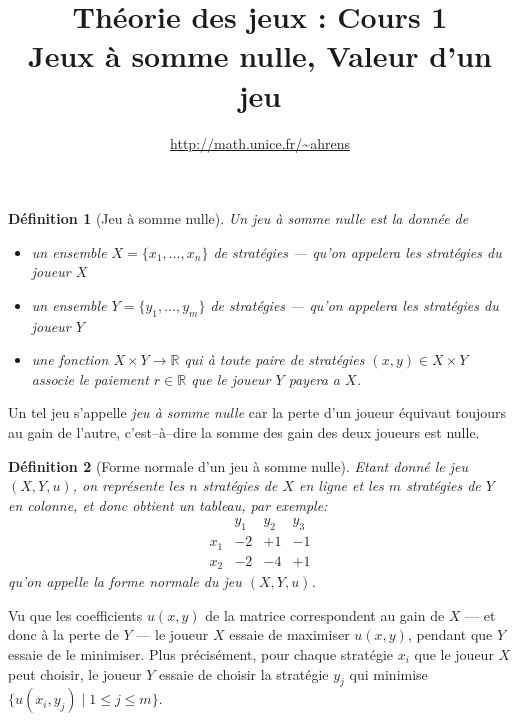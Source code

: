 \documentclass[11pt]{scrartcl}
\title{Th\'eorie des jeux : Cours 1 \\ {\large Jeux \`a somme nulle, Valeur d'un jeu}}
\author{\url{http://math.unice.fr/~ahrens}}
\date{}
\theoremstyle{mydefinition}
\newtheorem{definition}{D\'efinition}
\theoremstyle{myplain}
\newcommand{\R}{\ensuremath{\mathbb{R}}}
\begin{document}
\maketitle


\begin{definition}[Jeu \`a somme nulle]
 Un \emph{jeu \`a somme nulle} est la donn\'ee de
\begin{itemize}
 \item un ensemble $X = \{x_1,\ldots,x_n\}$ de \emph{strat\'egies} --- qu'on appelera les strat\'egies du joueur $X$
 \item un ensemble $Y = \{y_1,\ldots,y_m\}$ de \emph{strat\'egies} --- qu'on appelera les strat\'egies du joueur $Y$
 \item une fonction $X \times Y \to \R$ qui \`a toute paire de strat\'egies $(x,y)\in X\times Y$ associe le paiement $r\in \R$
       que le joueur $Y$ payera a $X$.
\end{itemize}
\end{definition}

Un tel jeu s'appelle \emph{jeu \`a somme nulle} car la perte d'un joueur \'equivaut toujours au gain de l'autre, c'est--\`a--dire
la somme des gain des deux joueurs est nulle.

\begin{definition}[Forme normale d'un jeu \`a somme nulle]\label{def:normal_form}
  Etant donn\'e le jeu $(X,Y,u)$, on repr\'esente les $n$ strat\'egies de $X$ en ligne 
et les $m$ strat\'egies de $Y$ en colonne, et donc obtient un tableau, par exemple:
\[
\begin{array}{l|rrr}
    & y_1 & y_2 & y_3 \\ \hline
x_1 &  -2 & +1 & -1 \\ 
x_2 &   -2 & -4 & +1
\end{array}
\]
qu'on appelle la \emph{forme normale} du jeu $(X,Y,u)$.
\end{definition}

Vu que les coefficients $u(x,y)$ de la matrice correspondent au gain de $X$ --- et donc \`a la perte de $Y$ --- 
le joueur $X$ essaie de maximiser $u(x,y)$, pendant que $Y$ essaie de le minimiser.
Plus pr\'ecis\'ement, pour chaque strat\'egie $x_i$ que le joueur $X$ peut choisir, le joueur $Y$ essaie de choisir la strat\'egie $y_j$ qui
minimise $\{ u(x_i,y_j) \mid 1 \leq j \leq m \}$.
\end{document}
